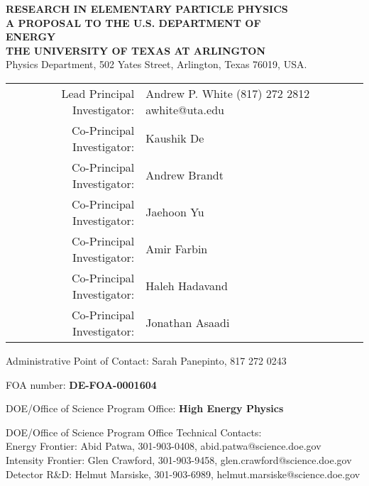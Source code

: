 \newpage
\begin{center}


{\Large\bf RESEARCH IN ELEMENTARY PARTICLE PHYSICS}  \\
\vspace{.75in}
{\Large\bf A PROPOSAL TO THE U.S. DEPARTMENT OF} \\
\vspace*{0.15in}
{\Large\bf  ENERGY} \\
\vspace{0.5in}
{\Large\bf THE UNIVERSITY OF TEXAS AT ARLINGTON} \\
Physics Department, 502 Yates Street, Arlington, Texas 76019, USA.

\vspace{0.5in}
%
\begin{table}[htb]
\centering
\renewcommand{\arraystretch}{1.15}
\begin{tabular}{rl} %
    Lead Principal Investigator:    & Andrew P. White  (817) 272 2812 awhite@uta.edu   \\
    Co-Principal Investigator:   & Kaushik De                       \\
    Co-Principal Investigator:   & Andrew Brandt                    \\
    Co-Principal Investigator:   & Jaehoon Yu                       \\
    Co-Principal Investigator:   & Amir Farbin                      \\
	Co-Principal Investigator:   & Haleh Hadavand                   \\
	Co-Principal Investigator:   & Jonathan Asaadi                  \\
\end{tabular}
\renewcommand{\arraystretch}{1.0}
\end{table}

Administrative Point of Contact: Sarah Panepinto, 817 272 0243
\vspace*{0.15in}

FOA number:  \textbf{DE-FOA-0001604}
\vspace*{0.15in}

DOE/Office of Science Program Office: \textbf{High Energy Physics}
\vspace*{0.15in}

DOE/Office of Science Program Office Technical Contacts:  \\
Energy Frontier: Abid Patwa, 301-903-0408, abid.patwa@science.doe.gov \\
Intensity Frontier: Glen Crawford, 301-903-9458, glen.crawford@science.doe.gov  \\
Detector R\&D: Helmut Marsiske, 301-903-6989, helmut.marsiske@science.doe.gov  \\
\vspace*{0.15in}


\end{center}
